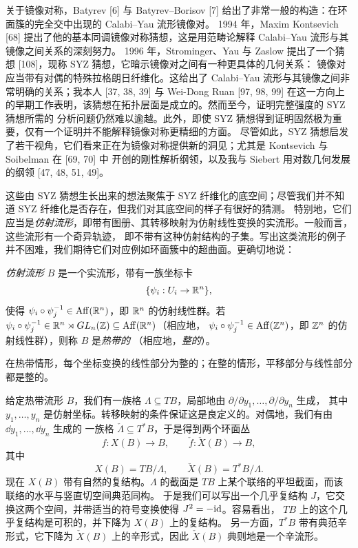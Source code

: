 关于镜像对称，Batyrev [6] 与 Batyrev--Borisov [7] 给出了非常一般的构造：在环面簇的完全交中出现的 Calabi--Yau 流形镜像对。
1994 年，Maxim Kontsevich [68] 提出了他的基本同调镜像对称猜想，这是用范畴论解释 Calabi--Yau 流形与其镜像之间关系的深刻努力。
1996 年，Strominger、Yau 与 Zaslow 提出了一个猜想 [108]，现称 SYZ 猜想，它暗示镜像对之间有一种更具体的几何关系：
镜像对应当带有对偶的特殊拉格朗日纤维化。这给出了 Calabi--Yau 流形与其镜像之间非常明确的关系；我本人 [37, 38, 39] 与
Wei-Dong Ruan [97, 98, 99] 在这一方向上的早期工作表明，该猜想在拓扑层面是成立的。然而至今，证明完整强度的 SYZ 猜想所需的
分析问题仍然难以逾越。此外，即使 SYZ 猜想得到证明固然极为重要，仅有一个证明并不能解释镜像对称更精细的方面。
尽管如此，SYZ 猜想启发了若干视角，它们看来正在为镜像对称提供新的洞见；尤其是 Kontsevich 与 Soibelman 在 [69, 70] 中
开创的刚性解析纲领，以及我与 Siebert 用对数几何发展的纲领 [47, 48, 51, 49]。

这些由 SYZ 猜想生长出来的想法聚焦于 SYZ 纤维化的底空间；尽管我们并不知道 SYZ 纤维化是否存在，但我们对其底空间的样子有很好的猜测。
特别地，它们应当是\emph{仿射流形}，即带有图册、其转移映射为仿射线性变换的实流形。一般而言，这些流形有一个奇异轨迹，
即不带有这种仿射结构的子集。写出这类流形的例子并不困难，我们期待它们对应例如环面簇中的超曲面。更确切地说：

\begin{definition}
\emph{仿射流形} $B$ 是一个实流形，带有一族坐标卡
\[
  \{\psi_i:U_i\to\mathbb{R}^n\},
\]
使得 $\psi_i\circ\psi_j^{-1}\in\operatorname{Aff}(\mathbb{R}^n)$，即 $\mathbb{R}^n$ 的仿射线性群。若
$\psi_i\circ\psi_j^{-1}\in\mathbb{R}^n\rtimes GL_n(\mathbb{Z})\subseteq\operatorname{Aff}(\mathbb{R}^n)$（相应地，
$\psi_i\circ\psi_j^{-1}\in\operatorname{Aff}(\mathbb{Z}^n)$，即 $\mathbb{Z}^n$ 的仿射线性群），则称 $B$ 是\emph{热带的}
（相应地，\emph{整的}）。
\end{definition}

在热带情形，每个坐标变换的线性部分为整的；在整的情形，平移部分与线性部分都是整的。

给定热带流形 $B$，我们有一族格 $\Lambda\subseteq TB$，局部地由 $\partial/\partial y_1,\dots,\partial/\partial y_n$ 生成，
其中 $y_1,\dots,y_n$ 是仿射坐标。转移映射的条件保证这是良定义的。对偶地，我们有由 $\dd y_1,\dots,\dd y_n$ 生成的
一族格 $\check\Lambda\subseteq T^*B$，于是得到两个环面丛
\[
  f:X(B)\to B,\qquad \check f:\check X(B)\to B,
\]
其中
\[
  X(B)=TB/\Lambda,\qquad \check X(B)=T^*B/\Lambda .
\]
现在 $X(B)$ 带有自然的复结构。$\Lambda$ 的截面是 $TB$ 上某个联络的平坦截面，而该联络的水平与竖直切空间典范同构。
于是我们可以写出一个几乎复结构 $J$，它交换这两个空间，并带适当的符号变换使得 $J^2=-\mathrm{id}$。容易看出，
$TB$ 上的这个几乎复结构是可积的，并下降为 $X(B)$ 上的复结构。
另一方面，$T^*B$ 带有典范辛形式，它下降为 $\check X(B)$ 上的辛形式，因此 $\check X(B)$ 典则地是一个辛流形。

